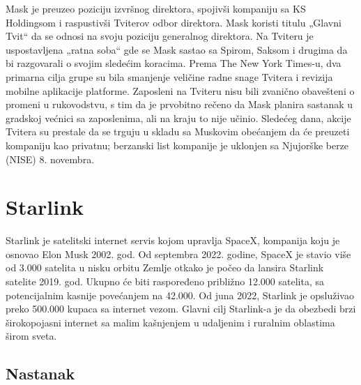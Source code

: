 \documentclass[a4paper,11pt]{article}
\begin{document}
Mask je preuzeo poziciju izvršnog direktora, spojivši kompaniju sa KS Holdingsom i raspustivši Tviterov odbor direktora. Mask koristi titulu „Glavni Tvit“ da se odnosi na svoju poziciju generalnog direktora. Na Tviteru je uspostavljena „ratna soba“ gde se Mask sastao sa Spirom, Saksom i drugima da bi razgovarali o svojim sledećim koracima. Prema The New York Times-u, dva primarna cilja grupe su bila smanjenje veličine radne snage Tvitera i revizija mobilne aplikacije platforme. Zaposleni na Tviteru nisu bili zvanično obavešteni o promeni u rukovodstvu, s tim da je prvobitno rečeno da Mask planira sastanak u gradskoj većnici sa zaposlenima, ali na kraju to nije učinio. Sledećeg dana, akcije Tvitera su prestale da se trguju u skladu sa Muskovim obećanjem da će preuzeti kompaniju kao privatnu; berzanski list kompanije je uklonjen sa Njujorške berze (NISE) 8. novembra.

\section{Starlink}
\label{Starlink}


Starlink je satelitski internet servis kojom upravlja SpaceX, kompanija koju je osnovao Elon Musk 2002. god. Od septembra 2022. godine, SpaceX je stavio više od 3.000 satelita u nisku orbitu Zemlje otkako je počeo da lansira Starlink satelite 2019. god. Ukupno će biti raspoređeno približno 12.000 satelita, sa potencijalnim kasnije povećanjem na 42.000. Od juna 2022, Starlink je opsluživao preko 500.000 kupaca sa internet vezom. Glavni cilj Starlink-a je da obezbedi brzi širokopojasni internet sa malim kašnjenjem u udaljenim i ruralnim oblastima širom sveta.


\subsection{Nastanak}
\label{sec:Nastanak}
\end{document}

